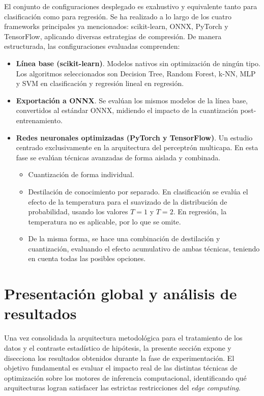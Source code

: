 \documentclass[a4paper,12pt,twoside,final]{book}
\begin{document}
El conjunto de configuraciones desplegado es exahustivo y equivalente tanto para clasificación como para regresión. Se
ha realizado a lo largo de los cuatro frameworks principales ya mencionados: scikit-learn, ONNX, PyTorch y TensorFlow,
aplicando diversas estrategias de compresión. De manera estructurada, las configuraciones evaluadas comprenden:
\begin{itemize}
  \item \textbf{Línea base (scikit-learn)}. Modelos nativos sin optimización de ningún tipo. Los algoritmos seleccionados son
  Decision Tree, Random Forest, k-NN, MLP y SVM en clasificación y regresión lineal en regresión.
  \item \textbf{Exportación a ONNX}. Se evalúan los mismos modelos de la línea base, convertidos al estándar ONNX,
  midiendo el impacto de la cuantización post-entrenamiento.
  \item \textbf{Redes neuronales optimizadas (PyTorch y TensorFlow)}. Un estudio centrado exclusivamente en la
  arquitectura del perceptrón multicapa. En esta fase se evalúan técnicas avanzadas de forma aislada y combinada.
  \begin{itemize}
    \item Cuantización de forma individual.
    \item Destilación de conocimiento por separado. En clasificación se evalúa el efecto de la temperatura para el
    suavizado de la distribución de probabilidad, usando los valores $T=1$ y $T=2$. En regresión, la temperatura
    no es aplicable, por lo que se omite.
    \item De la misma forma, se hace una combinación de destilación y cuantización, evaluando el efecto acumulativo de
    ambas técnicas, teniendo en cuenta todas las posibles opciones.
  \end{itemize}
\end{itemize}

\section{Presentación global y análisis de resultados}
Una vez consolidada la arquitectura metodológica para el tratamiento de los datos y el contraste estadístico de
hipótesis, la presente sección expone y disecciona los resultados obtenidos durante la fase de experimentación. El
objetivo fundamental es evaluar el impacto real de las distintas técnicas de optimización sobre los motores de
inferencia computacional, identificando qué arquitecturas logran satisfacer las estrictas restricciones del
\textit{edge computing}.\\
\end{document}
